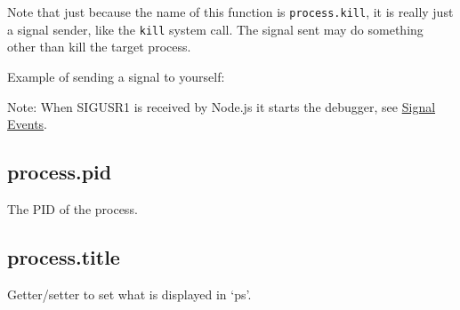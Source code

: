 Note that just because the name of this function is
\texttt{process.kill}, it is really just a signal sender, like the
\texttt{kill} system call. The signal sent may do something other than
kill the target process.

Example of sending a signal to yourself:

\begin{Shaded}
\begin{Highlighting}[]
\NormalTok{(}\NormalTok{, }\NormalTok{() \{}
  \NormalTok{(}\NormalTok{);}
\NormalTok{\});}

\NormalTok{(}\NormalTok{() \{}
  \NormalTok{(}\NormalTok{);}
  \NormalTok{(}\NormalTok{);}
\NormalTok{\}, }\NormalTok{);}

\NormalTok{(}\NormalTok{, }\NormalTok{);}
\end{Highlighting}
\end{Shaded}

Note: When SIGUSR1 is received by Node.js it starts the debugger, see
\hyperref[processux5fsignalux5fevents]{Signal Events}.

\subsection{process.pid}\label{process.pid}

The PID of the process.

\begin{Shaded}
\begin{Highlighting}[]
\NormalTok{(} \NormalTok{+ }\NormalTok{);}
\end{Highlighting}
\end{Shaded}

\subsection{process.title}\label{process.title}

Getter/setter to set what is displayed in `ps'.

